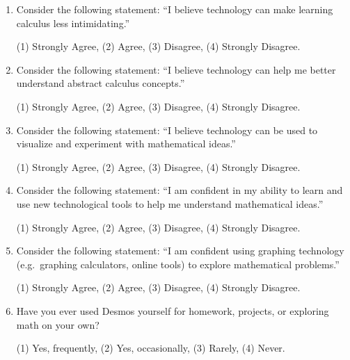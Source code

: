 \documentclass[11pt]{article}
\begin{document}
\begin{enumerate}[{$\qquad 1.]
\item Consider the following statement: ``I believe technology can make learning calculus less intimidating.''
\begin{center} 
(1) Strongly Agree, \qquad (2) Agree, \qquad (3) Disagree, \qquad (4) Strongly Disagree. \end{center}

\item Consider the following statement: ``I believe technology can help me better understand abstract calculus concepts.''
\begin{center} 
(1) Strongly Agree, \qquad (2) Agree, \qquad (3) Disagree, \qquad (4) Strongly Disagree. \end{center}

\item Consider the following statement: ``I believe technology can be used to visualize and experiment with mathematical ideas.''
\begin{center} 
(1) Strongly Agree, \qquad (2) Agree, \qquad (3) Disagree, \qquad (4) Strongly Disagree. \end{center}

	\pagebreak 

\thispagestyle{empty}

\item Consider the following statement: ``I am confident in my ability to learn and use new technological tools to help me understand mathematical ideas.''
\begin{center} 
(1) Strongly Agree, \qquad (2) Agree, \qquad (3) Disagree, \qquad (4) Strongly Disagree. \end{center}

\item Consider the following statement: ``I am confident using graphing technology (e.g.~graphing calculators, online tools) to explore mathematical problems.''
\begin{center} 
(1) Strongly Agree, \qquad (2) Agree, \qquad (3) Disagree, \qquad (4) Strongly Disagree. \end{center}


\item Have you ever used Desmos yourself for homework, projects, or exploring math on your own? 
\begin{center} 
(1) Yes, frequently, \qquad (2) Yes, occasionally, \qquad (3) Rarely, \qquad (4) Never. \end{center}


\end{enumerate}
\end{document}
